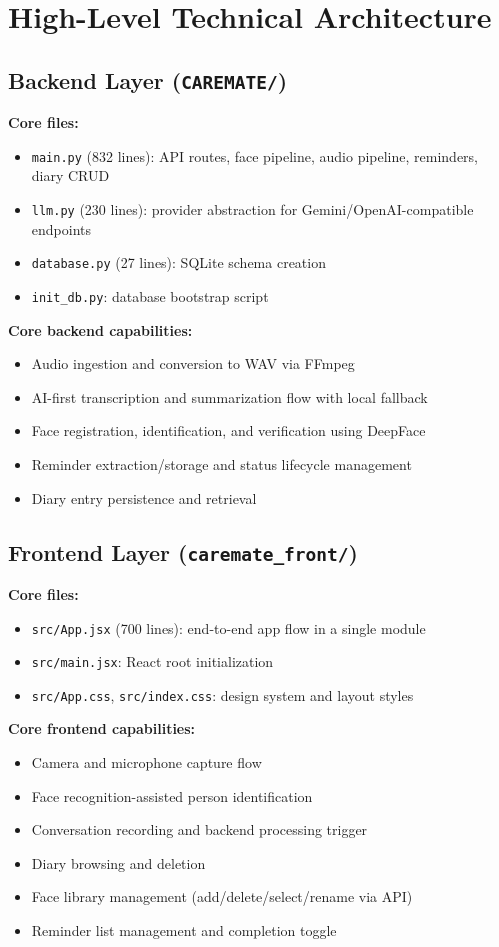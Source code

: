 \documentclass[12pt,a4paper]{article}
\begin{document}
\section{High-Level Technical Architecture}

\subsection{Backend Layer (\texttt{CAREMATE/})}
\textbf{Core files:}
\begin{itemize}
  \item \texttt{main.py} (832 lines): API routes, face pipeline, audio pipeline, reminders, diary CRUD
  \item \texttt{llm.py} (230 lines): provider abstraction for Gemini/OpenAI-compatible endpoints
  \item \texttt{database.py} (27 lines): SQLite schema creation
  \item \texttt{init\_db.py}: database bootstrap script
\end{itemize}

\textbf{Core backend capabilities:}
\begin{itemize}
  \item Audio ingestion and conversion to WAV via FFmpeg
  \item AI-first transcription and summarization flow with local fallback
  \item Face registration, identification, and verification using DeepFace
  \item Reminder extraction/storage and status lifecycle management
  \item Diary entry persistence and retrieval
\end{itemize}

\subsection{Frontend Layer (\texttt{caremate\_front/})}
\textbf{Core files:}
\begin{itemize}
  \item \texttt{src/App.jsx} (700 lines): end-to-end app flow in a single module
  \item \texttt{src/main.jsx}: React root initialization
  \item \texttt{src/App.css}, \texttt{src/index.css}: design system and layout styles
\end{itemize}

\textbf{Core frontend capabilities:}
\begin{itemize}
  \item Camera and microphone capture flow
  \item Face recognition-assisted person identification
  \item Conversation recording and backend processing trigger
  \item Diary browsing and deletion
  \item Face library management (add/delete/select/rename via API)
  \item Reminder list management and completion toggle
\end{itemize}
\end{document}
